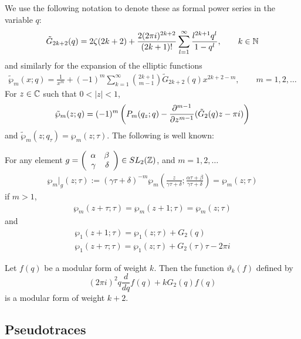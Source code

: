 \documentclass[12pt]{article}
\begin{document}
We use the following notation to denote these as formal power series in the
variable $q$:
\begin{align*}
  \tilde G_{2k+2}(q) = 2\zeta(2k+2) + \frac{2(2\pi i)^{2k+2}}{(2k+1)!}
  \sum_{l=1}^\infty \frac{l^{2k+1}q^l}{1 - q^l},\qquad k \in \mathbb{N}
\end{align*}
and similarly for the expansion of the elliptic functions
\begin{align*}
  \tilde \wp_m(x; q) = \frac{1}{x^m} + (-1)^m \sum_{k=1}^\infty
    \binom{2k+1}{m-1} \tilde G_{2k+2}(q) x^{2k+2 - m},\qquad m=1,2,\ldots
\end{align*}
For $z\in \mathbb{C}$ such that $0 < |z| < 1$,
\begin{align*}
  \tilde \wp_m(z;q) = (-1)^m
    \left(P_m(q_z;q) - \frac{\partial^{m-1}}{\partial z^{m-1}}(\tilde G_2(q)z - \pi i)\right)
\end{align*}
and $\tilde \wp_m(z; q_\tau) = \wp_m(z; \tau)$. The following is well known:
\begin{prop}
  For any element $g= \left(
      \begin{array}{r r}
        \alpha & \beta\\
        \gamma & \delta
      \end{array}
    \right)\in SL_2(\mathbb{Z})$, and $m=1,2,\ldots$
  \begin{align*}
    \wp_m|_g(z; \tau) := (\gamma \tau + \delta)^{-m}
      \wp_m\left(\frac{z}{\gamma \tau + \delta};
      \frac{\alpha\tau + \beta}{\gamma\tau+\delta}\right) = \wp_m(z;\tau)
  \end{align*}
  if $m > 1$,
  \begin{align*}
    \wp_m(z+\tau; \tau) = \wp_m(z+1; \tau) = \wp_m(z; \tau)
  \end{align*}
  and
  \begin{gather*}
    \wp_1(z+1;\tau) = \wp_1(z;\tau) + G_2(q)\\
    \wp_1(z+\tau; \tau) = \wp_1(z;\tau) + G_2(\tau)\tau -2\pi i
  \end{gather*}
\end{prop}

\begin{prop}
  Let $f(q)$ be a modular form of weight $k$. Then the function $\vartheta_k(f)$
  defined by
  \begin{equation*}
    (2\pi i)^2 q \frac{d}{dq}f(q) + k G_2(q)f(q)
  \end{equation*}
  is a modular form of weight $k+2$.
\end{prop}

\subsection{Pseudotraces}\label{sec:pt}
\end{document}
